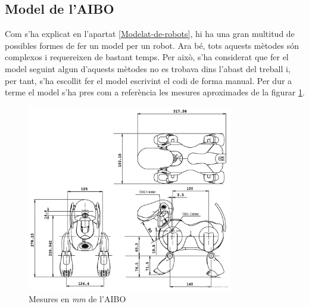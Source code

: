 \documentclass[12pt,a4paper,final,twoside]{article}
\begin{document}




\subsection{Model de l'AIBO}

Com s'ha explicat en l'apartat \ref{Modelat-de-robots}, hi ha una gran multitud de possibles formes de fer un model per un robot. Ara bé, tots aquests mètodes són complexos i requereixen de bastant temps. Per això, s'ha considerat que fer el model seguint algun d'aquests mètodes no es trobava dins l'abast del treball i, per tant, s'ha escollit fer el model escrivint el codi de forma manual. Per dur a terme el model s'ha pres com a referència les mesures aproximades de la figurar \ref{fig:mesures-aibo-model}.

\begin{figure}[tb]
\centering
\includegraphics[width=0.8\textwidth]{Imatges/aibo-4.pdf}
\caption{Mesures en \textit{mm} de l'AIBO \cite{Blueprint}}
\label{fig:mesures-aibo-model}
\end{figure}
\end{document}
